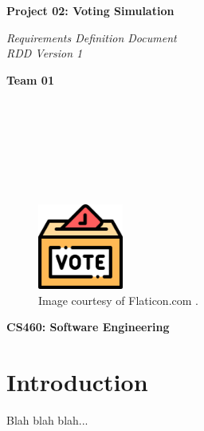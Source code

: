 \documentclass{article}
\begin{document}
\begin{titlepage}
\begin{center}
\vspace*{1cm}

\Huge
\textbf{Project 02: Voting Simulation}

\vspace{0.5cm}
\Large
\textit{Requirements Definition Document} \\
\textit{RDD Version 1}

\vspace{1cm}

\textbf{Team 01}

\vspace{0.5cm}

 \\
 \\
 \\
 \\
 \\
 \\

\vspace{1cm}

\begin{figure}[h]
    \centering
    \includegraphics[width=0.25\textwidth]{docs/rdd/figures/ballot_icon.png}
    \caption*{Image courtesy of Flaticon.com \cite{Flaticon_2019}.}
    \label{fig:safeIcon}
\end{figure}

\vspace{7cm}

\Large
\textbf{CS460: Software Engineering} \\

\end{center}
\end{titlepage}

\newpage

\tableofcontents

\newpage

\section{Introduction}
Blah blah blah...
\end{document}
